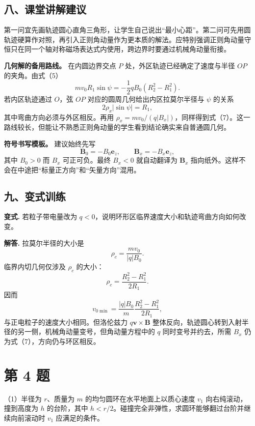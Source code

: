 \documentclass[12pt,a4paper,UTF8]{ctexart}
\begin{document}
\subsection{八、课堂讲解建议}\label{ux516bux8bfeux5802ux8bb2ux89e3ux5efaux8bae-2}

第一问宜先画轨迹圆心直角三角形，让学生自己说出``最小心距''。第二问可先用圆轨迹硬算作对照，再引入正则角动量作为更本质的解法。应特别强调正则角动量守恒只在同一个轴对称磁场表达式内使用，跨边界时要通过机械角动量衔接。

\textbf{几何解的备用路线。} 在内圆边界交点 \(P\)
处，外区轨迹已经确定了速度与半径 \(OP\) 的夹角。由式（5） \[
mv_0R_1\sin\psi
=-\frac12qB_0(R_2^2-R_1^2).
\] 若内区轨迹通过 \(O\)，弦 \(OP\) 对应的圆周几何给出内区拉莫尔半径与
\(\psi\) 的关系 \[
2\rho_x|\sin\psi|=R_1,
\] 其中弯曲方向必须与外区相反。再用
\(\rho_x=mv_0/(q|B_x|)\)，同样得到式（7）。这一路线较长，但能让不熟悉正则角动量的学生看到结论确实来自普通圆几何。

\textbf{符号书写模板。} 建议始终先写 \[
\bm B_0=-B_0\bm e_z,\qquad
\bm B_x=-B_x\bm e_z,
\] 其中 \(B_0>0\) 而 \(B_x\) 可正可负。最终 \(B_x<0\) 就自动翻译为
\(\bm B_x\) 指向纸外。这样不会在中途把``标量正方向''和``矢量方向''混用。

\subsection{九、变式训练}\label{ux4e5dux53d8ux5f0fux8badux7ec3-2}

\textbf{变式.} 若粒子带电量改为
\(q<0\)，说明环形区临界速度大小和轨迹弯曲方向如何改变。

\textbf{解答.} 拉莫尔半径的大小是 \[
\rho_c=\frac{mv_0}{|q|B_0}.
\] 临界内切几何仅涉及 \(\rho_c\) 的大小： \[
\rho_c=\frac{R_2^2-R_1^2}{2R_1}.
\] 因而 \[
\boxed{v_{0\min}=
\frac{|q|B_0}{m}
\frac{R_2^2-R_1^2}{2R_1}},
\] 与正电粒子的速度大小相同。但洛伦兹力 \(q\bm v\times\bm B\)
整体反向，轨迹圆心转到入射半径的另一侧，机械角动量变号，但角动量方程中的
\(q\) 同时变号并约去，所需 \(B_x\) 仍为式（7），方向仍与环区相反。

\newpage

\section{第 4 题}\label{ux7b2c-4-ux9898}

（1）半径为 \(r\)、质量为 \(m\) 的均匀圆环在水平地面上以质心速度 \(v_1\)
向右纯滚动，撞到高度为 \(h\) 的台阶，其中
\(h<r/2\)。碰撞完全非弹性，求圆环能够翻过台阶并继续向前滚动时 \(v_1\)
应满足的条件。
\end{document}
